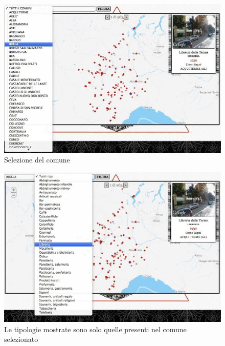 \begin{figure}[ht!]
	\caption{Selezione del comune}
	\centering
		\includegraphics[width=\textwidth]{img/s3.jpg}
\end{figure}

\begin{figure}[ht!]
	\caption{Le tipologie mostrate sono solo quelle presenti nel comune selezionato}
	\centering
		\includegraphics[width=\textwidth]{img/s4.jpg}
\end{figure}

